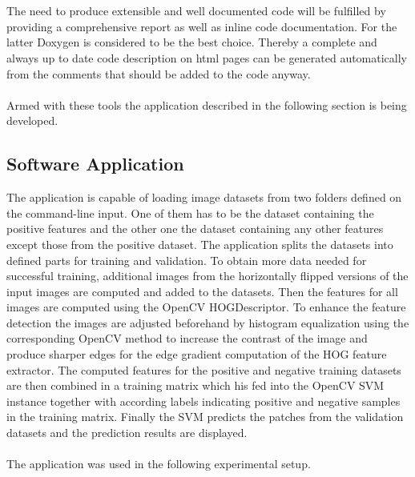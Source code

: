 \\
\\
The need to produce extensible and well documented code will be fulfilled by providing a comprehensive report as well as inline code documentation. For the latter Doxygen is considered to be the best choice. Thereby a complete and always up to date code description on html pages can be generated automatically from the comments that should be added to the code anyway.
\\
\\
Armed with these tools the application described in the following section is being developed.

\subsection{Software Application}

The application is capable of loading image datasets from two folders defined on the command-line input. One of them has to be the dataset containing the positive features and the other one the dataset containing any other features except those from the positive dataset. The application splits the datasets into defined parts for training and validation. To obtain more data needed for successful training, additional images from the horizontally flipped versions of the input images are computed and added to the datasets. Then the features for all images are computed using the OpenCV HOGDescriptor. To enhance the feature detection the images are adjusted beforehand by histogram equalization using the corresponding OpenCV method to increase the contrast of the image and produce sharper edges for the edge gradient computation of the HOG feature extractor. The computed features for the positive and negative training datasets are then combined in a training matrix which his fed into the OpenCV SVM instance together with according labels indicating positive and negative samples in the training matrix. Finally the SVM predicts the patches from the validation datasets and the prediction results are displayed.
\\
\\
The application was used in the following experimental setup.
